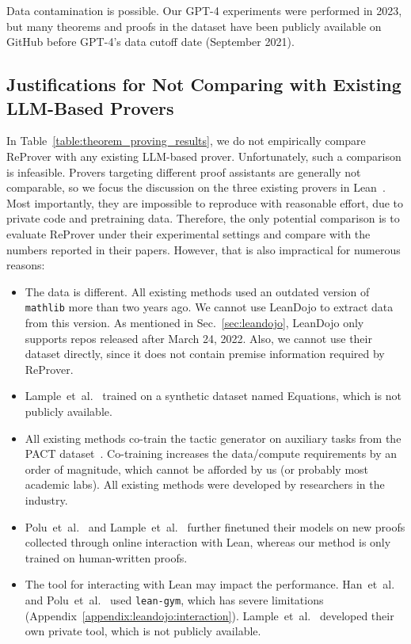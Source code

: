 \documentclass{article}
\newcommand\name{ReProver}
\begin{document}
Data contamination is possible. Our GPT-4 experiments were performed in 2023, but many theorems and proofs in the dataset have been publicly available on GitHub before GPT-4's data cutoff date (September 2021).


\subsection{Justifications for Not Comparing with Existing LLM-Based Provers}
\label{appendix:comparisons}

In Table~\ref{table:theorem_proving_results}, we do not empirically compare {\name} with any existing LLM-based prover. Unfortunately, such a comparison is infeasible. Provers targeting different proof assistants are generally not comparable, so we focus the discussion on the three existing provers in Lean~\cite{han2022proof,polu2023formal,lample2022hypertree}. Most importantly, they are impossible to reproduce with reasonable effort, due to private code and pretraining data. Therefore, the only potential comparison is to evaluate {\name} under their experimental settings and compare with the numbers reported in their papers. However, that is also impractical for numerous reasons:
\begin{itemize}[leftmargin=*]

\item The data is different. All existing methods used an outdated version of \texttt{mathlib} more than two years ago. We cannot use LeanDojo to extract data from this version. As mentioned in Sec.~\ref{sec:leandojo},
LeanDojo only supports repos released after March 24, 2022. Also, we cannot use their dataset directly, since it does not contain premise information required by {\name}.

\item Lample~et~al.~\cite{lample2022hypertree} trained on a synthetic dataset named Equations, which is not publicly available.

\item All existing methods co-train the tactic generator on auxiliary tasks from the PACT dataset~\cite{han2022proof}. Co-training increases the data/compute requirements by an order of magnitude, which cannot be afforded by us (or probably most academic labs). All existing methods were developed by researchers in the industry.

\item Polu~et~al.~\cite{polu2023formal} and Lample~et~al.~\cite{lample2022hypertree} further finetuned their models on new proofs collected through online interaction with Lean, whereas our method is only trained on human-written proofs.

\item The tool for interacting with Lean may impact the performance. Han~et~al.~\cite{han2022proof} and Polu~et~al.~\cite{polu2023formal} used \texttt{lean-gym}, which has severe limitations (Appendix~\ref{appendix:leandojo:interaction}). Lample~et~al.~\cite{lample2022hypertree} developed their own private tool, which is not publicly available.

\end{itemize}
\end{document}
